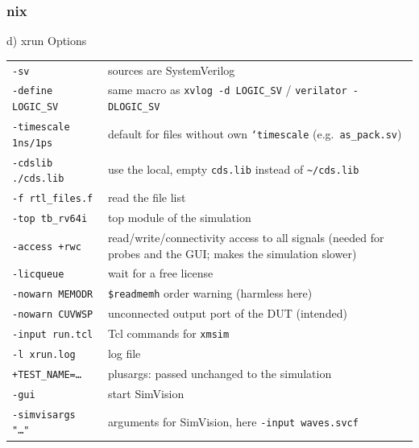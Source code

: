 \documentclass{beamer}
\newcommand{\astitle}{nix}
\newcommand{\assubtitle}{nix}
\newcommand{\cmd}[1]{\texttt{#1}}
\begin{document}
\renewcommand{\assubtitle}{d) xrun Options}
\begin{frame}
\frametitle{\astitle}
\begin{block}{\assubtitle}
  \scriptsize
  \begin{tabularx}{\linewidth}{@{}lY@{}}
    \cmd{-sv}                    & sources are SystemVerilog\\[1pt]
    \cmd{-define LOGIC\_SV}      & same macro as \cmd{xvlog -d LOGIC\_SV} / \cmd{verilator -DLOGIC\_SV}\\[1pt]
    \cmd{-timescale 1ns/1ps}     & default for files without own \cmd{`timescale} (e.g.\ \cmd{as\_pack.sv})\\[1pt]
    \cmd{-cdslib ./cds.lib}      & use the local, empty \cmd{cds.lib} instead of \cmd{\textasciitilde/cds.lib}\\[1pt]
    \cmd{-f rtl\_files.f}        & read the file list\\[1pt]
    \cmd{-top tb\_rv64i}         & top module of the simulation\\[1pt]
    \cmd{-access +rwc}           & read/write/connectivity access to all signals
                                   (needed for probes and the GUI; makes the simulation slower)\\[1pt]
    \cmd{-licqueue}              & wait for a free license\\[1pt]
    \cmd{-nowarn MEMODR}         & \cmd{\$readmemh} order warning (harmless here)\\[1pt]
    \cmd{-nowarn CUVWSP}         & unconnected output port of the DUT (intended)\\[1pt]
    \cmd{-input run.tcl}         & Tcl commands for \cmd{xmsim}\\[1pt]
    \cmd{-l xrun.log}            & log file\\[1pt]
    \cmd{+TEST\_NAME=\dots}      & plusargs: passed unchanged to the simulation\\[1pt]
    \cmd{-gui}                   & start SimVision\\[1pt]
    \cmd{-simvisargs "\dots"}    & arguments for SimVision, here \cmd{-input waves.svcf}\\
  \end{tabularx}
\end{block}
\end{frame}
\end{document}
